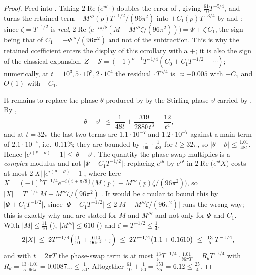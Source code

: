 \begin{proof}
\leanok
{}
Feed  into .  Taking $2\operatorname{Re}\bigl(e^{i\theta}\cdot\bigr)$ doubles the error of
, giving $\tfrac{61}{10}T^{-5/4}$, and turns the retained term
$-M'''(p)T^{-1/2}/(96\pi^{2})$ into $+C_{1}(p)T^{-3/4}$ by  and
: since $\zeta=T^{-1/2}$ is \emph{real},
$2\operatorname{Re}\bigl(e^{-i\pi/8}(M-M'''\zeta/(96\pi^{2}))\bigr)=\Psi+\zeta\,C_{1}$, the sign
being that of $C_{1}=-\Psi'''/(96\pi^{2})$ and not of the subtraction.  This is why the retained
coefficient enters the display of this corollary with a $+$; it is also the sign of the classical
expansion, $Z-\mathcal S=(-1)^{\nu-1}T^{-1/4}(C_{0}+C_{1}T^{-1/2}+\cdots)$; numerically, at
$t=10^{3},5\cdot10^{3},2\cdot10^{4}$ the residual $\cdot\,T^{5/4}$ is $\approx-0.005$ with
$+C_{1}$ and $O(1)$ with $-C_{1}$.

It remains to replace the phase $\theta$ produced by  by the Stirling phase
$\vartheta$ carried by .  By ,
\[
  \lvert\theta-\vartheta\rvert\;\le\;\frac1{48t}+\frac{319}{2880\,t^{3}}+\frac{12}{t^{4}} ,
\]
and at $t=32\pi$ the last two terms are $1.1\cdot10^{-7}$ and $1.2\cdot10^{-7}$ against a main
term of $2.1\cdot10^{-4}$, i.e.\ $0.11\%$; they are bounded by
$\tfrac1{100}\cdot\tfrac1{48t}$ for $t\ge32\pi$, so $\lvert\theta-\vartheta\rvert
\le\tfrac{1.01}{48t}$.  Hence $\lvert e^{i(\theta-\vartheta)}-1\rvert\le\lvert\theta-\vartheta
\rvert$.  The quantity the phase swap multiplies is a \emph{complex} modulus and not
$\lvert\Psi+C_{1}T^{-1/2}\rvert$: replacing $e^{i\theta}$ by $e^{i\vartheta}$ in
$2\operatorname{Re}\bigl(e^{i\theta}X\bigr)$ costs at most $2\lvert X\rvert\,\lvert
e^{i(\theta-\vartheta)}-1\rvert$, where here
$X=(-1)^{\nu}T^{-1/4}e^{-i(\vartheta+\pi/8)}\bigl(M(p)-M'''(p)\zeta/(96\pi^{2})\bigr)$, so
$\lvert X\rvert=T^{-1/4}\bigl\lvert M-M'''\zeta/(96\pi^{2})\bigr\rvert$.  It would be circular to
bound this by $\lvert\Psi+C_{1}T^{-1/2}\rvert$, since
$\lvert\Psi+C_{1}T^{-1/2}\rvert\le2\lvert M-M'''\zeta/(96\pi^{2})\rvert$ runs the wrong way; this
is exactly why  and  are stated for $M$ and
$M'''$ and not only for $\Psi$ and $C_{1}$.  With
$\lvert M\rvert\le\tfrac{11}{10}$ (),
$\lvert M'''\rvert\le610$ () and $\zeta=T^{-1/2}\le\tfrac14$,
\[
  2\lvert X\rvert\;\le\;2T^{-1/4}\Bigl(\tfrac{11}{10}
     +\tfrac{610}{96\pi^{2}}\cdot\tfrac14\Bigr)
  \;\le\;2T^{-1/4}\bigl(1.1+0.1610\bigr)\;\le\;\tfrac{13}5\,T^{-1/4},
\]
and with $t=2\pi T$ the phase-swap term is at most $\tfrac{13}5T^{-1/4}\cdot\tfrac{1.01}{96\pi
T}=R_{\theta}T^{-5/4}$ with
$R_{\theta}=\tfrac{13\cdot1.01}{5\cdot96\pi}=0.0087\ldots\le\tfrac1{50}$.  Altogether $\tfrac{61}{10}+\tfrac1{50}=\tfrac{153}{25}=6.12\le\tfrac{25}4$.


\end{proof}

